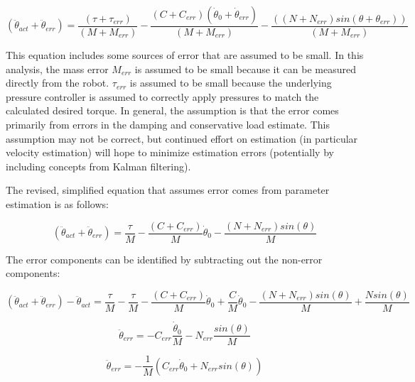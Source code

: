\begin{equation}
(\ddot{\theta}_{act} + \ddot{\theta}_{err}) = \dfrac{(\tau + \tau_{err})}{(M + M_{err})} - \dfrac{(C + C_{err}) (\dot{\theta}_{0} + \dot{\theta}_{err})}{(M + M_{err})} - \dfrac{((N + N_{err})sin(\theta + \theta_{err}))}{(M + M_{err})}
\end{equation}

This equation includes some sources of error that are assumed to be small. In 
this analysis, the mass error $M_{err}$ is assumed to be small because it can
be measured directly from the robot. $\tau_{err}$ is assumed to be small because
the underlying pressure controller is assumed to correctly apply pressures to
match the calculated desired torque. In general, the assumption is that the error
comes primarily from errors in the damping and conservative load estimate. This 
assumption may not be correct, but continued effort on estimation (in particular 
velocity estimation) will hope to minimize estimation errors (potentially by 
including concepts from Kalman filtering).

The revised, simplified equation that assumes error comes from parameter estimation is as follows:

\begin{equation}
(\ddot{\theta}_{act} + \ddot{\theta}_{err}) = \dfrac{\tau}{M} - \dfrac{(C + C_{err})}{M}\dot{\theta}_{0} - \dfrac{(N + N_{err})sin(\theta)}{M}
\end{equation}

The error components can be identified by subtracting out the non-error 
components:

\begin{equation}
(\ddot{\theta}_{act} + \ddot{\theta}_{err}) - \ddot{\theta}_{act} =
\dfrac{\tau}{M} - \dfrac{\tau}{M}
- \dfrac{(C + C_{err})}{M}\dot{\theta}_{0} + \dfrac{C}{M}\dot{\theta}_{0}
- \dfrac{(N + N_{err})sin(\theta)}{M}  + \dfrac{N sin(\theta)}{M}
\end{equation}

\begin{equation}
\ddot{\theta}_{err} =
- C_{err} \dfrac{\dot{\theta}_{0}}{M}
- N_{err} \dfrac{sin(\theta)}{M}
\end{equation}

\begin{equation}
\ddot{\theta}_{err} = - \dfrac{1}{M}
(C_{err} \dot{\theta}_{0} + N_{err} sin(\theta))
\end{equation}


